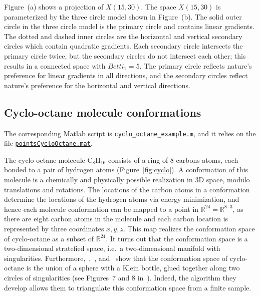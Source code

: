 \documentclass[amscd, amssymb, verbatim]{amsart}[12pt]
\theoremstyle{remark}
\theoremstyle{remark}
\theoremstyle{remark}
\newcommand{\R}{\mathbb{R}}
\newcommand{\cyclo}{\mathrm{C}_8\mathrm{H}_{16}}
\begin{document}
Figure~(a) shows a projection of $X(15,30)$. The space $X(15,30)$ is parameterized by the three circle model shown in Figure~(b). The solid outer circle in the three circle model is the primary circle and contains linear gradients. The dotted and dashed inner circles are the horizontal and vertical secondary circles which contain quadratic gradients. Each secondary circle intersects the primary circle twice, but the secondary circles do not intersect each other; this results in a connected space with $Betti_1 = 5$. The primary circle reflects nature's preference for linear gradients in all directions, and the secondary circles reflect nature's preference for the horizontal and vertical directions.


\subsection{Cyclo-octane molecule conformations}

The corresponding Matlab script is \href{https://github.com/appliedtopology/javaplex/tree/master/src/matlab/for_distribution/tutorial_examples/cyclo_octane_example.m}{\texttt{cyclo\_octane\_example.m}}, and it relies on the file \href{https://github.com/appliedtopology/javaplex/tree/master/src/matlab/for_distribution/tutorial_examples/pointsCycloOctane.mat}{\texttt{pointsCycloOctane.mat}}.

The cyclo-octane molecule $\cyclo$ consists of a ring of 8 carbons atoms, each bonded to a pair of hydrogen atoms (Figure~\ref{fig:cyclo}). A conformation of this molecule is a chemically and physically possible realization in 3D space, modulo translations and rotations. The locations of the carbon atoms in a conformation determine the locations of the hydrogen atoms via energy minimization, and hence each molecule conformation can be mapped to a point in $\R^{24}=\R^{8\cdot 3}$, as there are eight carbon atoms in the molecule and each carbon location is represented by three coordinates $x,y,z$. This map realizes the conformation space of cyclo-octane as a subset of $\R^{24}$. It turns out that the conformation space is a two-dimensional stratefied space, i.e.\ a two-dimensional manifold with singularities. Furthermore,~\citet{brown2008algorithmic},~\citet{martin2010topology}, and~\citet{martin2011non} show that the conformation space of cyclo-octane is the union of a sphere with a Klein bottle, glued together along two circles of singularities (see Figures~7 and 8 in~\citet{martin2011non}). Indeed, the algorithm they develop allows them to triangulate this conformation space from a finite sample.
\end{document}
